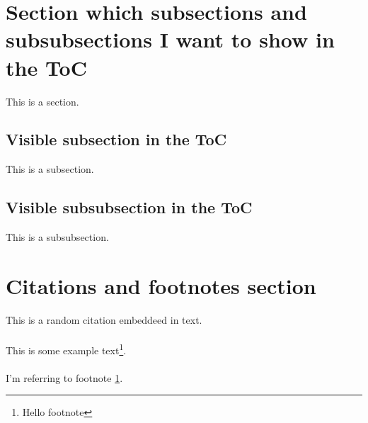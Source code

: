 \documentclass{book}
\begin{document}
\section{Section which subsections and subsubsections I want to show in the ToC}

This is a section.

\subsection{Visible subsection in the ToC}

This is a subsection.

\subsection{Visible subsubsection in the ToC}

This is a subsubsection.

\section{Citations and footnotes section}

This is a random citation \cite{DUMMY:1} embeddeed in text.

\paragraph{}

This is some example text\footnote{\label{myfootnote}Hello footnote}.

\paragraph{}

I'm referring to footnote \ref{myfootnote}.

\newpage
\cleardoublepage

 

\end{document}
